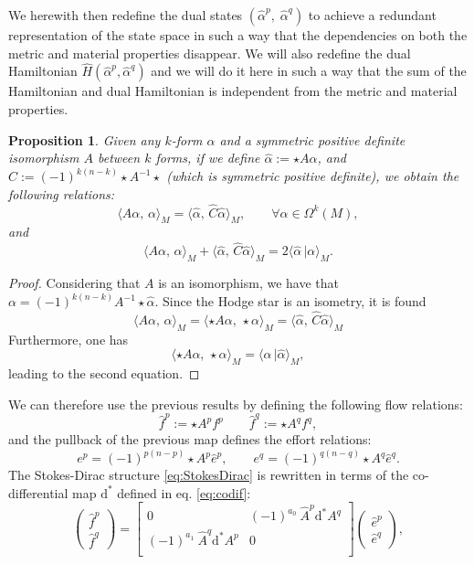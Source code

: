 \documentclass{elsarticle}
\newtheorem{proposition}{Proposition}
\renewcommand\d{\ensuremath{\mathrm{d}}}
\newcommand*{\dual}[1]{\ensuremath{\widehat{#1}}}
\newcommand{\inpr}[3][]{\ensuremath{\langle #2, \, #3 \rangle_{#1}}}
\newcommand{\dualpr}[3][]{\ensuremath{\langle #2 \, \vert #3 \rangle_{#1}}}
\begin{document}
We herewith then redefine the dual states $(\dual{\alpha}^p,\; \dual{\alpha}^q)$ to achieve a redundant representation of the state space in such a way that the dependencies on both the metric and material properties disappear. We will also redefine the dual Hamiltonian $\dual{H}(\dual{\alpha}^p,\dual{\alpha}^q)$ and we will do it here in such a way that the sum of the Hamiltonian and dual Hamiltonian is independent from the metric and material properties.
\begin{proposition}
Given any $k$-form $\alpha$ and a symmetric positive definite isomorphism $A$ between $k$ forms, if we define  $\dual{\alpha}:= \star A \alpha$, and
$\dual{C}:=(-1)^{k(n-k)}\star A^{-1} \star$ (which is symmetric positive definite), we obtain the following relations:
\begin{equation}\label{eq:EcoE}
    \inpr[M]{A \alpha}{\alpha}=\inpr[M]{\dual{\alpha}}{\dual{C}\dual{\alpha}}, \qquad \forall \alpha \in \Omega^k(M),
\end{equation}
and
\begin{equation}\label{eq:noMetric}
    \inpr[M]{A \alpha}{\alpha}+\inpr[M]{\dual{\alpha}}{\dual{C} \dual{\alpha}}
    =2\dualpr[M]{\dual{\alpha}}{\alpha}.
\end{equation}
\end{proposition}
\begin{proof}
Considering that $A$ is an isomorphism, we have that $\alpha=(-1)^{k(n-k)}A^{-1} \star \dual{\alpha}$. Since the Hodge star is an isometry, it is found
\begin{equation}
\inpr[M]{A \alpha}{\alpha} = \inpr[M]{\star A \alpha}{\star \alpha} = \inpr[M]{\dual{\alpha}}{\dual{C} \dual{\alpha}}
\end{equation}
Furthermore, one has
\begin{equation}
    \inpr[M]{\star A \alpha}{\star \alpha} = \dualpr[M]{\alpha}{\dual{\alpha}},
\end{equation}
leading to the second equation.
\end{proof}
We can therefore use the previous results by defining the following flow relations:
\[
\dual{f}^p:=\star A^p f^p
\qquad 
\dual{f}^q:=\star A^q f^q, 
\]
\noindent and the pullback of the previous map defines the effort relations:
\[
{e}^p=(-1)^{p(n-p)}\star A^p \dual{e}^p,
\qquad
{e}^q=(-1)^{q(n-q)}\star A^q \dual{e}^q.
\]
The Stokes-Dirac structure \eqref{eq:StokesDirac} is rewritten 
in terms of the co-differential map $\d^*$ defined in eq. \eqref{eq:codif}:
\begin{equation}\label{eq:AdjStokesDirac2}
    \begin{pmatrix}
    \dual{f}^{p} \\
    \dual{f}^{q} 
    \end{pmatrix} = 
    \begin{bmatrix}
        0 &  (-1)^{a_0}\
        \dual{A}^p \d^* A^q \\
        (-1)^{a_1}\ \dual{A}^q \d^* A^p & 0 \\
    \end{bmatrix}
    \begin{pmatrix}
        \dual{e}^{p}\\
        \dual{e}^{q}
    \end{pmatrix},
\end{equation}
\end{document}
